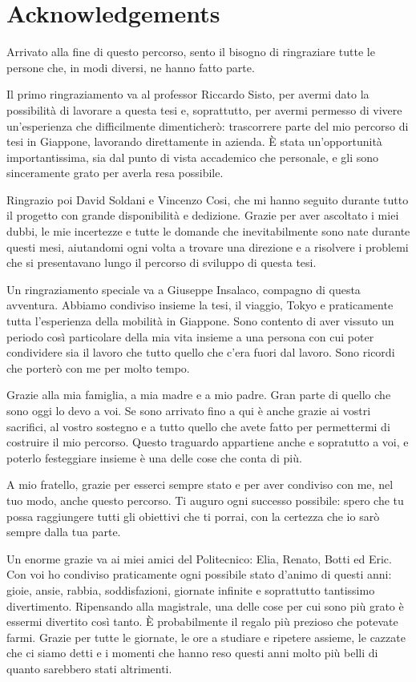 \chapter*{Acknowledgements}
\label{acknowledgements}

Arrivato alla fine di questo percorso, sento il bisogno di ringraziare tutte le persone che, in modi diversi, ne hanno fatto parte.

Il primo ringraziamento va al professor Riccardo Sisto, per avermi dato la possibilità di lavorare a questa tesi e, soprattutto, per avermi permesso di vivere un'esperienza che difficilmente dimenticherò: trascorrere parte del mio percorso di tesi in Giappone, lavorando direttamente in azienda. È stata un'opportunità importantissima, sia dal punto di vista accademico che personale, e gli sono sinceramente grato per averla resa possibile.

Ringrazio poi David Soldani e Vincenzo Cosi, che mi hanno seguito durante tutto il progetto con grande disponibilità e dedizione. Grazie per aver ascoltato i miei dubbi, le mie incertezze e tutte le domande che inevitabilmente sono nate durante questi mesi, aiutandomi ogni volta a trovare una direzione e a risolvere i problemi che si presentavano lungo il percorso di sviluppo di questa tesi.

Un ringraziamento speciale va a Giuseppe Insalaco, compagno di questa avventura. Abbiamo condiviso insieme la tesi, il viaggio, Tokyo e praticamente tutta l'esperienza della mobilità in Giappone. Sono contento di aver vissuto un periodo così particolare della mia vita insieme a una persona con cui poter condividere sia il lavoro che tutto quello che c'era fuori dal lavoro. Sono ricordi che porterò con me per molto tempo.

Grazie alla mia famiglia, a mia madre e a mio padre. Gran parte di quello che sono oggi lo devo a voi. Se sono arrivato fino a qui è anche grazie ai vostri sacrifici, al vostro sostegno e a tutto quello che avete fatto per permettermi di costruire il mio percorso. Questo traguardo appartiene anche e sopratutto a voi, e poterlo festeggiare insieme è una delle cose che conta di più.

A mio fratello, grazie per esserci sempre stato e per aver condiviso con me, nel tuo modo, anche questo percorso. Ti auguro ogni successo possibile: spero che tu possa raggiungere tutti gli obiettivi che ti porrai, con la certezza che io sarò sempre dalla tua parte.

Un enorme grazie va ai miei amici del Politecnico: Elia, Renato, Botti ed Eric. Con voi ho condiviso praticamente ogni possibile stato d'animo di questi anni: gioie, ansie, rabbia, soddisfazioni, giornate infinite e soprattutto tantissimo divertimento. Ripensando alla magistrale, una delle cose per cui sono più grato è essermi divertito così tanto. È probabilmente il regalo più prezioso che potevate farmi. Grazie per tutte le giornate, le ore a studiare e ripetere assieme, le cazzate che ci siamo detti e i momenti che hanno reso questi anni molto più belli di quanto sarebbero stati altrimenti.

